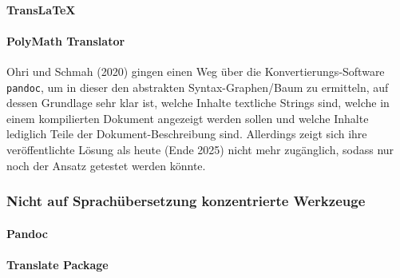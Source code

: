 \paragraph*{TransLaTeX}\par
% 

\paragraph*{PolyMath Translator}
Ohri und Schmah (2020) gingen einen Weg über die Konvertierungs-Software \texttt{pandoc}, um in dieser den abstrakten Syntax-Graphen/Baum zu ermitteln, auf dessen Grundlage sehr klar ist, welche Inhalte textliche Strings sind, welche in einem kompilierten Dokument angezeigt werden sollen und welche Inhalte lediglich Teile der Dokument-Beschreibung sind. Allerdings zeigt sich ihre veröffentlichte Lösung als heute (Ende 2025) nicht mehr zugänglich, sodass nur noch der Ansatz getestet werden könnte.

\subsubsection{Nicht auf Sprachübersetzung konzentrierte Werkzeuge}
\paragraph*{Pandoc}\par
\paragraph*{Translate Package}\par




